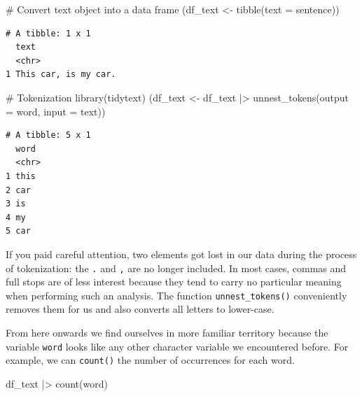 \documentclass[
  letterpaper,
  DIV=11,
  numbers=noendperiod]{scrreprt}
\newenvironment{Shaded}{\begin{snugshade}}{\end{snugshade}}
\newcommand{\AttributeTok}[1]{\textcolor[rgb]{0.40,0.45,0.13}{#1}}
\newcommand{\CommentTok}[1]{\textcolor[rgb]{0.37,0.37,0.37}{#1}}
\newcommand{\FunctionTok}[1]{\textcolor[rgb]{0.28,0.35,0.67}{#1}}
\newcommand{\NormalTok}[1]{\textcolor[rgb]{0.00,0.23,0.31}{#1}}
\newcommand{\OtherTok}[1]{\textcolor[rgb]{0.00,0.23,0.31}{#1}}
\newcommand{\SpecialCharTok}[1]{\textcolor[rgb]{0.37,0.37,0.37}{#1}}
\begin{document}
\begin{Shaded}
\begin{Highlighting}[]
\CommentTok{\# Convert text object into a data frame}
\NormalTok{(df\_text }\OtherTok{\textless{}{-}} \FunctionTok{tibble}\NormalTok{(}\AttributeTok{text =}\NormalTok{ sentence))}
\end{Highlighting}
\end{Shaded}

\begin{verbatim}
# A tibble: 1 x 1
  text                
  <chr>               
1 This car, is my car.
\end{verbatim}

\begin{Shaded}
\begin{Highlighting}[]
\CommentTok{\# Tokenization}
\FunctionTok{library}\NormalTok{(tidytext)}
\NormalTok{(df\_text }\OtherTok{\textless{}{-}}\NormalTok{ df\_text }\SpecialCharTok{|\textgreater{}} \FunctionTok{unnest\_tokens}\NormalTok{(}\AttributeTok{output =}\NormalTok{ word,}
                                      \AttributeTok{input =}\NormalTok{ text))}
\end{Highlighting}
\end{Shaded}

\begin{verbatim}
# A tibble: 5 x 1
  word 
  <chr>
1 this 
2 car  
3 is   
4 my   
5 car  
\end{verbatim}

If you paid careful attention, two elements got lost in our data during
the process of tokenization: the \texttt{.} and \texttt{,} are no longer
included. In most cases, commas and full stops are of less interest
because they tend to carry no particular meaning when performing such an
analysis. The function \texttt{unnest\_tokens()} conveniently removes
them for us and also converts all letters to lower-case.

From here onwards we find ourselves in more familiar territory because
the variable \texttt{word} looks like any other character variable we
encountered before. For example, we can \texttt{count()} the number of
occurrences for each word.

\begin{Shaded}
\begin{Highlighting}[]
\NormalTok{df\_text }\SpecialCharTok{|\textgreater{}} \FunctionTok{count}\NormalTok{(word)}
\end{Highlighting}
\end{Shaded}
\end{document}

